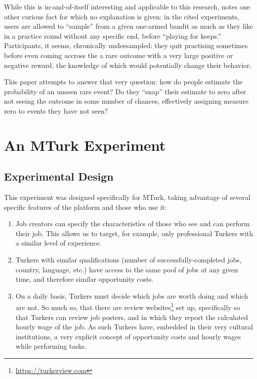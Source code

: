 \documentclass[a4paper,12pt]{article}
\begin{document}
While this is in-and-of-itself interesting and applicable to this research, \cite{hertwig2004} notes one other curious fact for which no explanation is given: in the cited experiments, users are allowed to ``sample'' from a given one-armed bandit as much as they like in a practice round without any specific end, before ``playing for keeps.'' Participants, it seems, chronically undersampled: they quit practising sometimes before even coming accross the a rare outcome with a very large positive or negative reward, the knowledge of which would potentially change their behavior.

This paper attempts to answer that very question: how do people estimate the probability of an unseen rare event? Do they ``snap'' their estimate to zero after not seeing the outcome in some number of chances, effectively assigning measure zero to events they have not seen?


\section{ An MTurk Experiment }

\subsection{ Experimental Design }

This experiment was designed specifically for MTurk, taking advantage of several specific features of the platform and those who use it:

\begin{enumerate}
\item Job creators can specify the characteristics of those who see and can perform their job. This allows us to target, for example, only professional Turkers with a similar level of experience.
\item Turkers with similar qualifications (number of successfully-completed jobs, country, language, etc.) have access to the same pool of jobs at any given time, and therefore similar opportunity costs.
\item On a daily basis, Turkers must decide which jobs are worth doing and which are not. So much so, that there are review websites\footnote{\url{https://turkerview.com}} set up, specifically so that Turkers can review job posters, and in which they report the calculated hourly wage of the job. As such Turkers have, embedded in their very cultural institutions, a very explicit concept of opportunity costs and hourly wages while performing tasks.
\end{enumerate}
\end{document}
